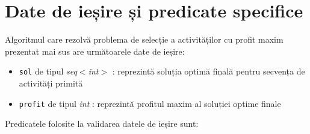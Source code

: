 \section{Date de ieșire și predicate specifice }
\label{subsec:datedeiesire}
Algoritmul care rezolvă problema de selecție a activităților cu profit maxim prezentat mai sus are următoarele date de ieșire:
\begin{itemize}
    \item \texttt{sol} de tipul {\textit{seq$<$int$>$}} : reprezintă soluția optimă finală pentru secvența de activități primită 
    \item \texttt{profit} de tipul \textit{int} : reprezintă profitul maxim al soluției optime finale
\end{itemize}

Predicatele folosite la validarea datele de ieșire sunt:
